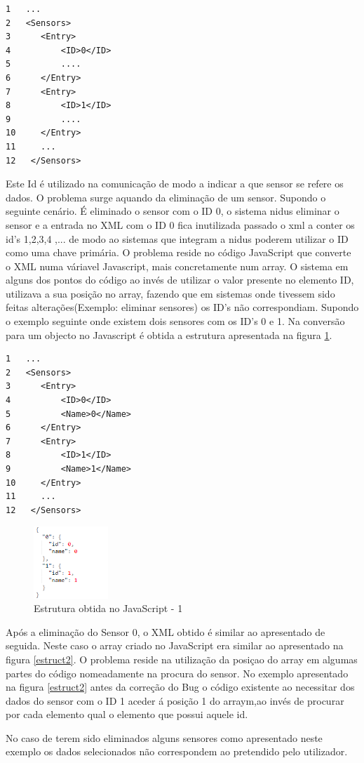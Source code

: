 \begin{verbatim}
1   ...
2   <Sensors>
3      <Entry>
4          <ID>0</ID>
5          ....
6      </Entry>
7      <Entry>
8          <ID>1</ID>
9          ....
10     </Entry>
11     ...
12   </Sensors>

 \end{verbatim}



\par Este Id é utilizado na comunicação de modo a indicar a que sensor se refere os dados. O problema surge aquando da eliminação de um sensor. Supondo o seguinte cenário. É eliminado o sensor com o ID 0, o sistema nidus eliminar o sensor e a entrada no XML com o ID 0 fica inutilizada  passado o xml a conter os id's 1,2,3,4 ,... de modo ao sistemas que integram a nidus poderem utilizar o ID como uma chave primária. O problema reside no código JavaScript que converte o XML numa váriavel Javascript, mais concretamente num array. O sistema em alguns dos pontos do código ao invés de utilizar o valor presente no elemento ID, utilizava a sua posição no array, fazendo que em sistemas onde tivessem sido feitas alterações(Exemplo: eliminar sensores) os ID's não correspondiam. Supondo o exemplo seguinte onde existem dois sensores com os ID's 0 e 1.  Na conversão para um objecto no Javascript é obtida a estrutura apresentada na figura \ref{estruct1}.

\begin{verbatim}
1   ...
2   <Sensors>
3      <Entry>
4          <ID>0</ID>
5          <Name>0</Name>
6      </Entry>
7      <Entry>
8          <ID>1</ID>
9          <Name>1</Name>
10     </Entry>
11     ...
12   </Sensors>

 \end{verbatim}

 \begin{figure}[ht]
\centering
\includegraphics[width=0.25\textwidth]{images/estructu1.png}
\caption{Estrutura obtida no JavaScript - 1}\label{estruct1}
\end{figure}

\par Após a eliminação do Sensor 0, o XML obtido é similar ao apresentado de seguida. Neste caso o array criado no JavaScript era similar ao apresentado na figura \ref{estruct2}. O problema reside na utilização da posiçao do array em algumas partes do código nomeadamente na procura do sensor. No exemplo apresentado na figura \ref{estruct2} antes da correção do Bug o código existente ao necessitar dos dados do sensor com o ID 1 aceder á posição 1 do arraym,ao invés de procurar por cada elemento qual o elemento que possui aquele id. 
\par No caso de terem sido eliminados alguns sensores como apresentado neste exemplo os dados selecionados não correspondem ao pretendido pelo utilizador.

